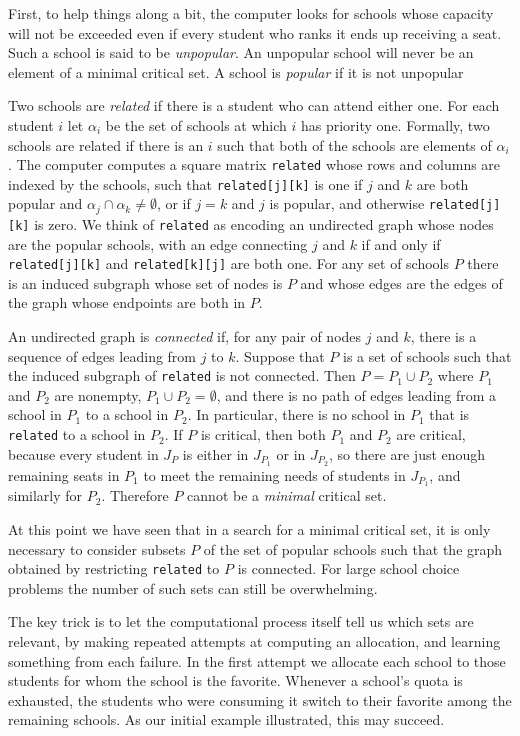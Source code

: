 \documentclass[12pt]{article}
\theoremstyle{definition}
\begin{document}
First, to help things along a bit, the computer looks for schools
whose capacity will not be exceeded even if every student who ranks it
ends up receiving a seat.  Such a school is said to be
\emph{unpopular}.  An unpopular school will never be an element of a
minimal critical set. A school is \emph{popular} if it is not
unpopular

Two schools are \emph{related} if there is a student who can attend
either one.  For each student $i$ let $\alpha_i$ be the set of schools
at which $i$ has priority one.  Formally, two schools are related if
there is an $i$ such that both of the schools are elements of
$\alpha_i$.  The computer computes a square matrix \texttt{related}
whose rows and columns are indexed by the schools, such that
\texttt{related[j][k]} is one if $j$ and $k$ are both popular and
$\alpha_j \cap \alpha_k \ne \emptyset$, or if $j = k$ and $j$ is
popular, and otherwise \texttt{related[j][k]} is zero.  We think of
\texttt{related} as encoding an undirected graph whose nodes are the
popular schools, with an edge connecting $j$ and $k$ if and only if
\texttt{related[j][k]} and \texttt{related[k][j]} are both one.  For
any set of schools $P$ there is an induced subgraph whose set of nodes
is $P$ and whose edges are the edges of the graph whose endpoints are
both in $P$.

An undirected graph is \emph{connected} if, for any pair of nodes $j$
and $k$, there is a sequence of edges leading from $j$ to $k$.
Suppose that $P$ is a set of schools such that the induced subgraph of
\texttt{related} is not connected.  Then $P = P_1 \cup P_2$ where
$P_1$ and $P_2$ are nonempty, $P_1 \cup P_2 = \emptyset$, and there is
no path of edges leading from a school in $P_1$ to a school in $P_2$.
In particular, there is no school in $P_1$ that is \texttt{related} to
a school in $P_2$.  If $P$ is critical, then both $P_1$ and $P_2$ are
critical, because every student in $J_P$ is either in $J_{P_1}$ or in
$J_{P_2}$, so there are just enough remaining seats in $P_1$ to meet
the remaining needs of students in $J_{P_1}$, and similarly for $P_2$.
Therefore $P$ cannot be a \emph{minimal} critical set.

At this point we have seen that in a search for a minimal critical
set, it is only necessary to consider subsets $P$ of the set of
popular schools such that the graph obtained by restricting
\texttt{related} to $P$ is connected.  For large school choice
problems the number of such sets can still be overwhelming.

The key trick is to let the computational process itself tell us which
sets are relevant, by making repeated attempts at computing an
allocation, and learning something from each failure.  In the first
attempt we allocate each school to those students for whom the school
is the favorite.  Whenever a school's quota is exhausted, the students
who were consuming it switch to their favorite among the remaining
schools.  As our initial example illustrated, this may succeed.
\end{document}
